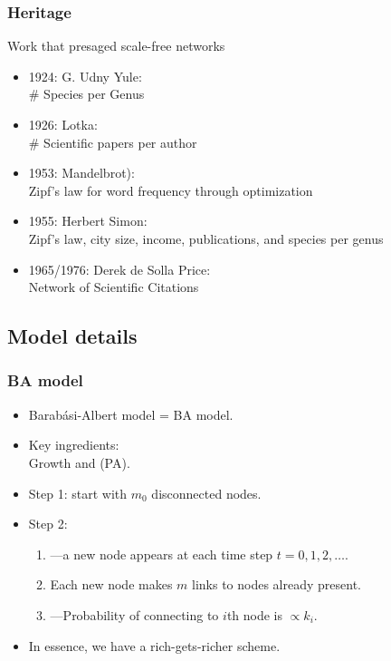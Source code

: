 \begin{frame}
  \frametitle{Heritage}

  \begin{block}{Work that presaged scale-free networks}
    \begin{itemize}
    \item <1->
      1924: \alert{G. Udny Yule}\cite{yule1924a}:\\ \# Species per Genus
    \item <2->
      1926: \alert{Lotka}\cite{lotka1926a}:\\ \# Scientific papers per author
    \item <3-> 
      1953: \alert{Mandelbrot}\cite{mandelbrot1953a}):\\
      Zipf's law for word frequency through optimization
    \item <4->
      1955: \alert{Herbert Simon}\cite{simon1955a,zipf1949a}:\\ Zipf's law, 
      city size, income, publications, and species per genus
    \item <5->
      1965/1976: \alert{Derek de Solla Price}\cite{price1965a,price1976a}:\\ Network of Scientific Citations
    \end{itemize}
  \end{block}

\end{frame}

\subsection{Model details}

\begin{frame}[label=]
 \frametitle{BA model}  
 
 \begin{itemize}
 \item<1-> 
   Barab\'{a}si-Albert model = BA model.
 \item<2-> 
   Key ingredients:\\
   \alert{Growth} and  (PA).
 \item<3-> 
   \alert{Step 1}: start with $m_0$ disconnected nodes.
 \item<4-> 
   \alert{Step 2}: 
   \begin{enumerate}
   \item<5->  
     ---a new node appears at each time step $t=0,1,2, \ldots$.
   \item<6-> 
     Each new node makes $m$ links to nodes already present.
   \item<7-> 
     ---Probability 
     of connecting to $i$th node is $\propto k_i$.
   \end{enumerate}
 \item<8->
   In essence, we have a \alert{rich-gets-richer} scheme.
 \end{itemize}

\end{frame}

